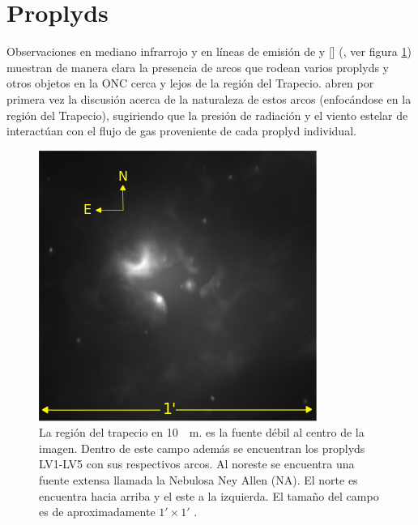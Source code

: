 \section{Proplyds}
Observaciones en mediano infrarrojo y en líneas de emisión de  y [] (\citet{Robberto:2005, Bally:1998, Bally:2000}, ver figura \ref{fig:prop-bally-robberto}) muestran de manera clara la presencia de arcos que rodean varios proplyds y otros objetos en la ONC cerca y lejos de la región del Trapecio. \citet{Hayward:1994} abren por primera vez la discusión acerca de la naturaleza de estos arcos (enfocándose en la región del Trapecio), sugiriendo que la presión de radiación y el viento estelar de \thC{} interactúan con el flujo de gas proveniente de cada proplyd individual.

\begin{figure}
  \centering
  \includegraphics[width=0.7\linewidth]{./Figures/Orion_Robberto}
  \caption{La región del trapecio en \SI{10}{\mu m}. \thC{} es la fuente débil al centro de la imagen. Dentro de este campo además se encuentran los proplyds LV1-LV5 con sus respectivos arcos. Al noreste se encuentra una fuente extensa llamada la Nebulosa Ney Allen (NA). El norte es encuentra hacia arriba y el este a la izquierda. El tamaño del campo es de aproximadamente $1' \times 1'$ \citep{Robberto:2005}.}
  \label{fig:prop-bally-robberto}
\end{figure}

